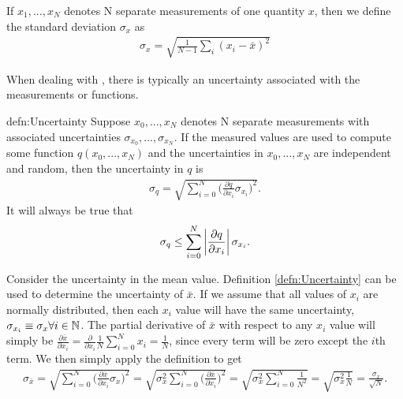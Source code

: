 \begin{defn}{1}
	If $x_1, ..., x_N$ denotes N separate measurements of one quantity $x$, then we define the standard deviation $\sigma_x$ as
	\begin{align}
		\sigma_x = \sqrt{\frac{1}{N-1}\sum_{i}(x_i-\bar{x})^2}
	\end{align}
\end{defn}

When dealing with , there is typically an uncertainty associated with the measurements or functions.

\begin{defn}[Uncertainty]{defn:Uncertainty}
	Suppose $x_0, ..., x_N$ denotes N separate measurements with associated uncertainties $\sigma_{x_0}, ..., \sigma_{x_N}$. If the measured values are used to compute some function $q(x_0, ..., x_N)$ and the uncertainties in $x_0, ..., x_N$ are independent and random, then the uncertainty in $q$ is
	\begin{align}
		\sigma_q = \sqrt{\sum_{i=0}^{N}\bigg(\frac{\partial q}{\partial x_i} \sigma_{x_i}\bigg)^2}.
	\end{align}
 It will always be true that 
 	\begin{align}
		\sigma_q \leq \sum_{i=0}^{N}\left| \frac{\partial q}{\partial x_i} \right| \sigma_{x_i}.
	\end{align}
\end{defn}

Consider the uncertainty in the mean value. Definition \ref{defn:Uncertainty} can be used to determine the uncertainty of $\bar{x}$. If we assume that all values of $x_i$ are normally distributed, then each $x_i$ value will have the same uncertainty, $\sigma_{x_i}\equiv \sigma_x\forall i\in{\mathbb N}$. The partial derivative of $\bar{x}$ with respect to any $x_i$ value will simply be $\frac{\partial\bar{x}}{\partial x_i} = \frac{\partial}{\partial x_i} \frac{1}{N}\sum_{i=0}^{N}x_i = \frac{1}{N}$, since every term will be zero except the $i$th term. We then simply apply the definition to get
	\begin{align}
	\sigma_{\bar{x}} = \sqrt{\sum_{i=0}^{N}\bigg(\frac{\partial \bar{x}}{\partial x_i} \sigma_{x}\bigg)^2} =  \sqrt{\sigma_{x}^2\sum_{i=0}^{N}\bigg(\frac{\partial \bar{x}}{\partial x_i}\bigg)^2} = \sqrt{\sigma_{x}^2\sum_{i=0}^{N}\frac{1}{N^2}} = \sqrt{\sigma_{x}^2\frac{1}{N}} = \frac{\sigma_x}{\sqrt{N}}.
\end{align}

 
